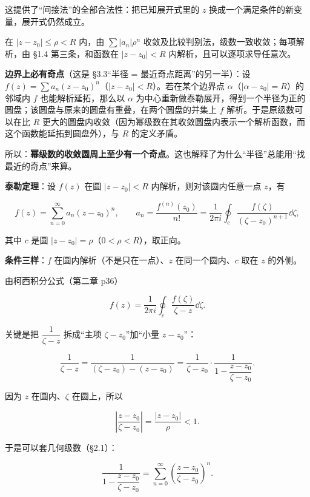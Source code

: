 \documentclass[11pt]{ctexart}
\let\origsubhdr\subhdr
\renewcommand{\subhdr}[1]{\par\needspace{4\baselineskip}\origsubhdr{#1}}
\let\orighdr\hdr
\renewcommand{\hdr}[2]{\par\needspace{9\baselineskip}\orighdr{#1}{#2}}
\begin{document}
这提供了“间接法”的全部合法性：把已知展开式里的 $z$ 换成一个满足条件的新变量，展开式仍然成立。


在 $|z-z_0|\le\rho<R$ 内，由 $\sum|a_n|\rho^n$ 收敛及比较判别法，级数一致收敛；每项解析，由 §1.4 第三条，和函数在 $|z-z_0|<R$ 内解析，且可以逐项求导任意次。

\textbf{边界上必有奇点}（这是 §3.3“半径 = 最近奇点距离”的另一半）：设 $f(z)=\sum a_n(z-z_0)^n$（$|z-z_0|<R$）。若在某个边界点 $\alpha$（$|\alpha-z_0|=R$）的邻域内 $f$ 也能解析延拓，那么以 $\alpha$ 为中心重新做泰勒展开，得到一个半径为正的圆盘；该圆盘与原来的圆盘有重叠，在两个圆盘的并集上 $f$ 解析。于是原级数可以在比 $R$ 更大的圆盘内收敛（因为幂级数在其收敛圆盘内表示一个解析函数，而这个函数能延拓到圆盘外），与 $R$ 的定义矛盾。

所以：\textbf{幂级数的收敛圆周上至少有一个奇点}。这也解释了为什么“半径”总能用“找最近的奇点”来算。



\textbf{泰勒定理}：设 $f(z)$ 在圆 $|z-z_0|<R$ 内解析，则对该圆内任意一点 $z$，有

\[ f(z)=\sum_{n=0}^{\infty}a_n(z-z_0)^n ,\qquad a_n=\frac{f^{(n)}(z_0)}{n!}=\frac{1}{2\pi i}\oint_c\frac{f(\zeta)}{(\zeta-z_0)^{n+1}}\dd\zeta , \]

其中 $c$ 是圆 $|z-z_0|=\rho$（$0<\rho<R$），取正向。

\textbf{条件三样}：$f$ 在圆内解析（不是只在一点）、$z$ 在同一个圆内、$c$ 取在 $z$ 的外侧。


由柯西积分公式（第二章 p36）

\[ f(z)=\frac{1}{2\pi i}\oint_c\frac{f(\zeta)}{\zeta-z}\dd\zeta . \]

关键是把 $\dfrac{1}{\zeta-z}$ 拆成“主项 $\zeta-z_0$”加“小量 $z-z_0$”：

\[ \frac{1}{\zeta-z}=\frac{1}{(\zeta-z_0)-(z-z_0)}=\frac{1}{\zeta-z_0}\cdot\frac{1}{1-\dfrac{z-z_0}{\zeta-z_0}} . \]

因为 $z$ 在圆内、$\zeta$ 在圆上，所以

\[ \left|\frac{z-z_0}{\zeta-z_0}\right|=\frac{|z-z_0|}{\rho}<1 . \]

于是可以套几何级数（§2.1）：

\[ \frac{1}{1-\dfrac{z-z_0}{\zeta-z_0}}=\sum_{n=0}^{\infty}\left(\frac{z-z_0}{\zeta-z_0}\right)^n . \]
\end{document}
